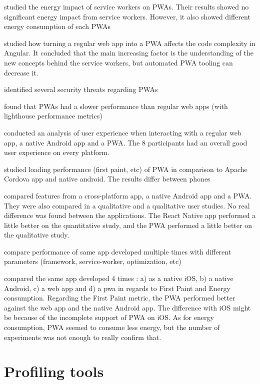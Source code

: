     \cite{SW_and_energy} studied the energy impact of service workers on PWAs. Their results showed no significant energy impact from service workers. However, it also showed different energy consumption of each PWAs
    
    \cite{JohannsenFabian2018PWAa} studied how turning a regular web app into a PWA affects the code complexity in Angular. It concluded that the main increasing factor is the understanding of the new concepts behind the service workers, but automated PWA tooling can decrease it.
    
    \cite{Pride_Prejudice} identified several security threats regarding PWAs
    
    \cite{bac_pwa_comparison} found that PWAs had a slower performance than regular web apps (with lighthouse performance metrics)
    
    \cite{PWA_UX_comparison_study} conducted an analysis of user experience when interacting with a regular web app, a native Android app and a PWA. The 8 participants had an overall good user experience on every platform.
    
    \cite{bac_pwa_performance} studied loading performance (first paint, etc) of PWA in comparison to Apache Cordova app and native android. The results differ between phones %
    
    \cite{emulating_native_w_crossplatform} compared features from a cross-platform app, a native Android app and a PWA. They were also compared in a qualitative and a qualitative user studies. No real difference was found between the applications. The React Native app performed a little better on the quantitative study, and the PWA performed a little better on the qualitative study.
    
    \cite{PWADatabase} compare performance of same app developed multiple times with different parameters (framework, service-worker, optimization, etc)
    
    \cite{PWAapplicability} compared the same app developed 4 times : a) as a native iOS, b) a native Android, c) a web app and d) a pwa in regards to First Paint and Energy consumption. Regarding the First Paint metric, the PWA performed better against the web app and the native Android app. The difference with iOS might be because of the incomplete support of PWA on iOS. As for energy consumption, PWA seemed to consume less energy, but the number of experiments was not enough to really confirm that.

\section{Profiling tools}

